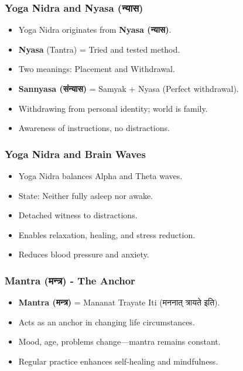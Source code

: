 \begin{frame}[fragile]\frametitle{Yoga Nidra and Nyasa (न्यास)}
      \begin{itemize}
        \item Yoga Nidra originates from \textbf{Nyasa (न्यास)}.
        \item \textbf{Nyasa} (Tantra) = Tried and tested method.
        \item Two meanings: Placement and Withdrawal.
        \item \textbf{Sannyasa (संन्यास)} = Samyak + Nyasa (Perfect withdrawal).
        \item Withdrawing from personal identity; world is family.
        \item Awareness of instructions, no distractions.
      \end{itemize}
\end{frame}

\begin{frame}[fragile]\frametitle{Yoga Nidra and Brain Waves}
      \begin{itemize}
        \item Yoga Nidra balances Alpha and Theta waves.
        \item State: Neither fully asleep nor awake.
        \item Detached witness to distractions.
        \item Enables relaxation, healing, and stress reduction.
        \item Reduces blood pressure and anxiety.
      \end{itemize}
\end{frame}

\begin{frame}[fragile]\frametitle{Mantra (मन्त्र) - The Anchor}
      \begin{itemize}
        \item \textbf{Mantra (मन्त्र)} = Mananat Trayate Iti (मननात् त्रायते इति).
        \item Acts as an anchor in changing life circumstances.
        \item Mood, age, problems change—mantra remains constant.
        \item Regular practice enhances self-healing and mindfulness.
      \end{itemize}
\end{frame}

